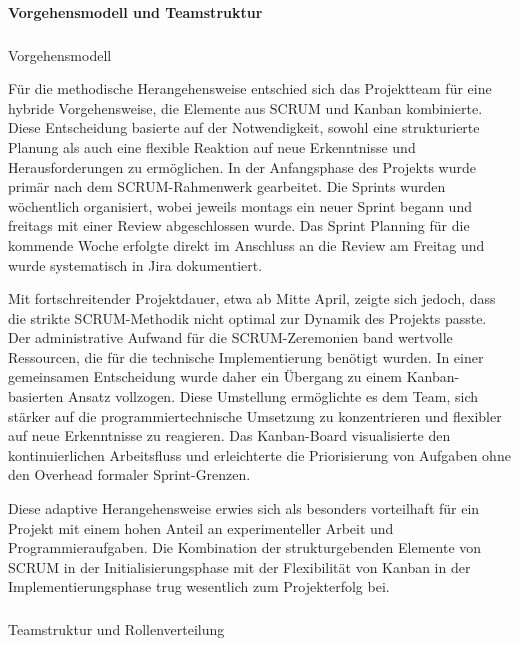 \paragraph{Vorgehensmodell und Teamstruktur}

\subparagraph{}{Vorgehensmodell}

Für die methodische Herangehensweise entschied sich das Projektteam für eine hybride Vorgehensweise, die Elemente aus SCRUM und Kanban kombinierte. Diese Entscheidung basierte auf der Notwendigkeit, sowohl eine strukturierte Planung als auch eine flexible Reaktion auf neue Erkenntnisse und Herausforderungen zu ermöglichen. In der Anfangsphase des Projekts wurde primär nach dem SCRUM-Rahmenwerk gearbeitet. Die Sprints wurden wöchentlich organisiert, wobei jeweils montags ein neuer Sprint begann und freitags mit einer Review abgeschlossen wurde. Das Sprint Planning für die kommende Woche erfolgte direkt im Anschluss an die Review am Freitag und wurde systematisch in Jira dokumentiert.

Mit fortschreitender Projektdauer, etwa ab Mitte April, zeigte sich jedoch, dass die strikte SCRUM-Methodik nicht optimal zur Dynamik des Projekts passte. Der administrative Aufwand für die SCRUM-Zeremonien band wertvolle Ressourcen, die für die technische Implementierung benötigt wurden. In einer gemeinsamen Entscheidung wurde daher ein Übergang zu einem Kanban-basierten Ansatz vollzogen. Diese Umstellung ermöglichte es dem Team, sich stärker auf die programmiertechnische Umsetzung zu konzentrieren und flexibler auf neue Erkenntnisse zu reagieren. Das Kanban-Board visualisierte den kontinuierlichen Arbeitsfluss und erleichterte die Priorisierung von Aufgaben ohne den Overhead formaler Sprint-Grenzen.

Diese adaptive Herangehensweise erwies sich als besonders vorteilhaft für ein Projekt mit einem hohen Anteil an experimenteller Arbeit und Programmieraufgaben. Die Kombination der strukturgebenden Elemente von SCRUM in der Initialisierungsphase mit der Flexibilität von Kanban in der Implementierungsphase trug wesentlich zum Projekterfolg bei.



\subparagraph{}{Teamstruktur und Rollenverteilung}


